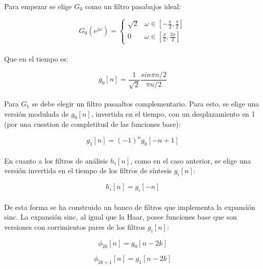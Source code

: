 \paragraph{}
Para empezar se elige $G_{0}$ como un filtro pasabajos ideal:

\[ G_{0}(e^{j\omega}) = \begin{cases} 
      \sqrt{2} & \omega \in [-\frac{\pi}{2}, \frac{\pi}{2}] \\
      0 & \omega \in [\frac{\pi}{2}, \frac{3\pi}{2}]
   \end{cases}
\]

\paragraph{}
Que en el tiempo es:

\begin{equation}
  g_{0}[n] = \frac{1}{\sqrt{2}} \frac{sin \pi n / 2}{\pi n / 2}
\end{equation}

\paragraph{}
Para $G_{1}$ se debe elegir un filtro pasaaltos complementario. Para esto, se elige una versión modulada de $g_{0}[n]$, invertida en el tiempo, con un desplazamiento en 1 (por una cuestion de completitud de las funciones base):

\begin{equation}
  g_{1}[n] = (-1)^n g_{0}[-n + 1]
\end{equation}

\paragraph{}
En cuanto a los filtros de análisis $h_{i}[n]$, como en el caso anterior, se elige una versión invertida en el tiempo de los filtros de síntesis $g_{i}[n]$:

\begin{equation}
  h_{i}[n] = g_{i}[-n]
\end{equation}

\paragraph{}
De esta forma se ha construido un banco de filtros que implementa la expansión sinc. La expansión sinc, al igual que la Haar, posee funciones base que son versiones con corrimientos pares de los filtros $g_{i}[n]$:

\begin{equation}
  \phi_{2k}[n] = g_{0}[n - 2k]
\end{equation}

\begin{equation}
  \phi_{2k + 1}[n] = g_{1}[n - 2k]
\end{equation}
